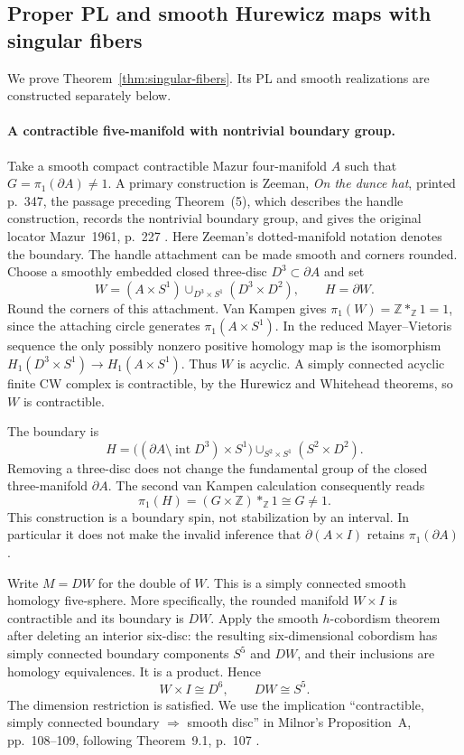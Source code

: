 \documentclass[11pt,a4paper]{article}
\theoremstyle{definition}
\begin{document}
\subsection{Proper PL and smooth Hurewicz maps with singular fibers}\label{sec:singular-fibers}
We prove Theorem~\ref{thm:singular-fibers}. Its PL and smooth realizations are constructed separately below.

\paragraph{A contractible five-manifold with nontrivial boundary group.}
Take a smooth compact contractible Mazur four-manifold $A$ such that
$G=\pi_1(\partial A)\ne1$.  A primary construction is Zeeman,
\emph{On the dunce hat}, printed p.~347, the passage preceding Theorem~(5),
which describes the handle construction, records the nontrivial boundary
group, and gives the original locator Mazur~1961, p.~227
\cite[p.~347]{Zeeman}.  Here Zeeman's dotted-manifold notation denotes
the boundary.  The handle attachment can be made smooth and corners rounded.
Choose a smoothly embedded closed three-disc $D^3\subset\partial A$ and set
\[
 W=(A\times S^1)\mathop{\cup}_{D^3\times S^1}(D^3\times D^2),
 \qquad H=\partial W.
 \tag{Q1}
\]
Round the corners of this attachment.  Van Kampen gives
$\pi_1(W)=\mathbb Z*_{\mathbb Z}1=1$, since the attaching circle generates
$\pi_1(A\times S^1)$.  In the reduced Mayer--Vietoris sequence the only
possibly nonzero positive homology map is the isomorphism
$H_1(D^3\times S^1)\to H_1(A\times S^1)$.  Thus $W$ is acyclic.
A simply connected acyclic finite CW complex is contractible, by the
Hurewicz and Whitehead theorems, so $W$ is contractible.

The boundary is
\[
 H=\bigl((\partial A\setminus\operatorname{int}D^3)\times S^1\bigr)
       \mathop{\cup}_{S^2\times S^1}(S^2\times D^2).
 \tag{Q2}
\]
Removing a three-disc does not change the fundamental group of the closed
three-manifold $\partial A$.  The second van Kampen calculation consequently
reads
\[
 \pi_1(H)=(G\times\mathbb Z)*_{\mathbb Z}1\cong G\ne1.
\]
This construction is a boundary spin, not stabilization by an interval.
In particular it does not make the invalid inference that
$\partial(A\times I)$ retains $\pi_1(\partial A)$.

Write $M=DW$ for the double of $W$.  This is a simply connected smooth
homology five-sphere.  More specifically, the rounded manifold $W\times I$
is contractible and its boundary is $DW$.  Apply the smooth $h$-cobordism
theorem after deleting an interior six-disc: the resulting six-dimensional
cobordism has simply connected boundary components $S^5$ and $DW$, and their
inclusions are homology equivalences.  It is a product.  Hence
\[
 W\times I\cong D^6,\qquad DW\cong S^5.
 \tag{Q3}
\]
The dimension restriction is satisfied.  We use the implication
``contractible, simply connected boundary $\Rightarrow$ smooth disc'' in
Milnor's Proposition~A, pp.~108--109, following Theorem~9.1, p.~107
\cite[\S9]{Milnor}.
\end{document}
